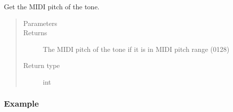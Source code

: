 \documentclass[letterpaper,10pt,english]{sphinxmanual}
\begin{document}
\begin{fulllineitems}
\begin{fulllineitems}
\begin{sphinxVerbatim}[commandchars=\\\{\}]
  
  
 
\end{sphinxVerbatim}

\end{fulllineitems}



\begin{fulllineitems}
Get the MIDI pitch of the tone.
\begin{quote}\begin{description}
\item[{Parameters}] \leavevmode
{} \textendash{} 

\item[{Returns}] \leavevmode
The MIDI pitch of the tone if it is in MIDI pitch range (0\textendash{}128)

\item[{Return type}] \leavevmode
int

\end{description}\end{quote}
\subsubsection*{Example}

\begin{sphinxVerbatim}[commandchars=\\\{\}]
  
\end{sphinxVerbatim}

\end{fulllineitems}




\end{fulllineitems}
\end{document}
